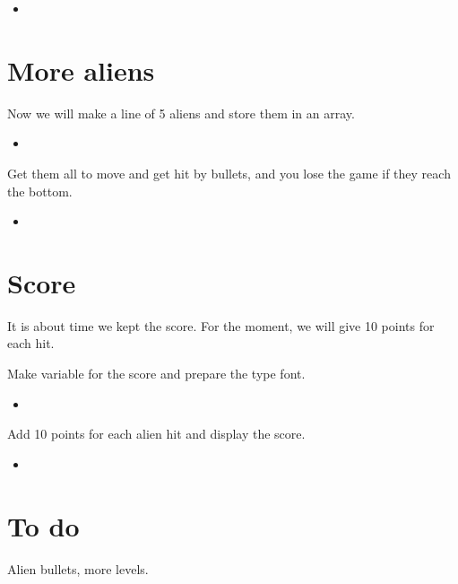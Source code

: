 \documentclass[12pt]{article}
\newcommand{\pythonscript}[2]{
\begin{itemize}
\item[]
\end{itemize}
}
\begin{document}
\pythonscript{hitalien}{Hit the alien}

\section{More aliens}

Now we will make a line of 5 aliens and store them in an array.

\pythonscript{fivealiens}{Line of 5 aliens}

Get them all to move and get hit by bullets, and you lose the game if they
reach the bottom.

\pythonscript{moveallaliens}{Line of 5 aliens}

\section{Score}

It is about time we kept the score. For the moment, we will give 10 points
for each hit.

Make variable for the score and prepare the type font.

\pythonscript{scorevariable}{Score variable}

Add 10 points for each alien hit and display the score.

\pythonscript{scorehit}{Score a hit}

\section{To do}

Alien bullets, more levels.
\end{document}
